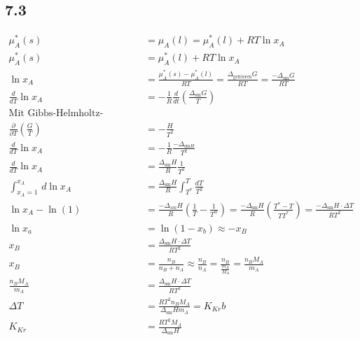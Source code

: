 \documentclass{article}
\begin{document}
\subsection*{7.3}
\begin{align*}
    \mu^*_A(s) &= \mu_A(l) = \mu^*_A(l) + RT \ln x_A\\
    \mu^*_A(s) &= \mu^*_A(l) +RT\ln x_A\\
    \ln x_A &= \frac{\mu^*_A(s) - \mu^*_A(l)}{RT} = \frac{\Delta_{\text{gefrieren}}G}{RT} = \frac{-\Delta_{\text{sm}} G }{RT}\\
    \frac{d}{dT}\ln x_A &= -\frac{1}{R}\frac{d}{dt}\left(\frac{\Delta_{\text{sm}} G}{T}\right)\\
    \text{Mit Gibbs-Helmholtz-Gleichung:}\\
    \frac{\partial}{\partial T} \left(\frac{G}{T}\right) &= -\frac{H}{T^2}\\
    \frac{d}{dT}\ln x_A &= -\frac{1}{R} \frac{-\Delta_{\text{sm}H}}{T^2}\\
    \frac{d}{dT}\ln x_A &= \frac{\Delta_{\text{sm}}H}{R} \frac{1}{T^2}\\
    \int_{x_A = 1}^{x_A}\,d\ln x_A &= \frac{\Delta_{\text{sm}}H}{R}\int_{T^*}^{T}\frac{dT}{T^2}\\
    \ln x_A - \ln (1) &= \frac{-\Delta_{sm}H}{R} \left(\frac{1}{T}-\frac{1}{T^\alpha}\right) = \frac{-\Delta_{\text{sm}}H}{R}\left(\frac{T^*-T}{TT^*}\right) = \frac{-\Delta_{\text{sm}}H\cdot \Delta T}{RT^2}\\
    \ln x_a &= \ln (1-x_b) \approx -x_B\\
    x_B &= \frac{\Delta_{\text{sm}}H\cdot \Delta T}{RT^2}\\
    x_B &= \frac{n_B}{n_B+n_A} \approx \frac{n_B}{n_A} = \frac{n_B}{\frac{m_A}{M_A}} = \frac{n_B M_A}{m_A}\\
    \frac{n_B M_A}{m_A} &= \frac{\Delta_{\text{sm}}H\cdot \Delta T}{RT^2}\\
    \Delta T &= \frac{RT^2 n_B M_A}{\Delta_{\text{sm}}H m_A} = K_{Kr}b\\
    K_{Kr} &= \frac{RT^2 M_A}{\Delta_{\text{sm}}H}
\end{align*}
\end{document}
